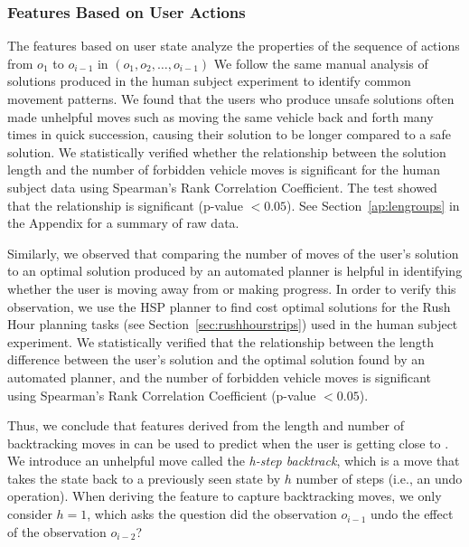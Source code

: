 \subsubsection{Features Based on User Actions}
The features based on user state analyze the properties of the sequence of actions from $o_1$ to $o_{i-1}$ in \historyDef $( o_1, o_2, \ldots, o_{i-1} )$
We follow the same manual analysis of solutions produced in the human subject experiment to identify common movement patterns. 
We found that the users who produce unsafe solutions often made unhelpful moves such as moving the same vehicle back and forth many times in quick succession, causing their solution to be longer compared to a safe solution. 
We statistically verified whether the relationship between the solution length and the number of forbidden vehicle moves is significant for the human subject data using Spearman's Rank Correlation Coefficient. 
The test showed that the relationship is significant (p-value $<0.05$). 
See Section~\ref{ap:lengroups} in the Appendix for a summary of raw data.

Similarly, we observed that comparing the number of moves of the user's solution to an optimal solution produced by an automated planner is helpful in identifying whether the user is moving away from \desired or making progress. 
In order to verify this observation, we use the HSP planner \cite{bonet01planningas} to find cost optimal solutions for the Rush Hour planning tasks (see Section~\ref{sec:rushhourstrips}) used in the human subject experiment.
We statistically verified that the relationship between the length difference between the user's solution and the optimal solution found by an automated planner, and the number of forbidden vehicle moves is significant using Spearman's Rank Correlation Coefficient (p-value $<0.05$).

Thus, we conclude that features derived from the length and number of backtracking moves in \historyDef can be used to predict when the user is getting close to \undesired. 
We introduce an unhelpful move called the \textit{h-step backtrack}, which is a move that takes the  state back to a previously seen state by $h$ number of steps (i.e., an undo operation).
When deriving the feature to capture backtracking moves, we only consider $h=1$, which asks the question did the observation $o_{i-1}$ undo the effect of the observation $o_{i-2}$?

